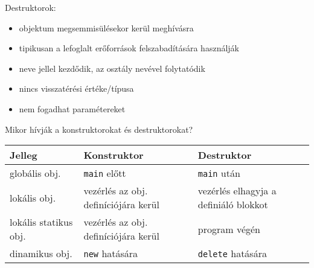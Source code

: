 \documentclass[usenames,dvipsnames,aspectratio=169]{beamer}
\begin{document}
\begin{frame}
    \begin{exampleblock}{}
        
    \end{exampleblock}
\end{frame}

\begin{frame}
    \begin{exampleblock}{}
        
    \end{exampleblock}
\end{frame}

\begin{frame}
    Destruktorok:
    \begin{itemize}
        \item objektum megsemmisülésekor kerül meghívásra
        \item tipikusan a lefoglalt erőforrások felszabadítására használják
        \item neve \kiemel{\textasciitilde} jellel kezdődik, az osztály nevével folytatódik
        \item nincs visszatérési értéke/típusa
        \item nem fogadhat paramétereket
    \end{itemize}
\end{frame}

\begin{frame}
    Mikor hívják a konstruktorokat és destruktorokat?
    \begin{center}
        \begin{tabular}{ p{3cm}|p{4.5cm}|p{4.5cm} } 
        Jelleg & Konstruktor & Destruktor \\
        \hline
        globális obj. & \texttt{main} előtt & \texttt{main} után \\
        lokális obj. & vezérlés az obj. definíciójára kerül & vezérlés elhagyja a definiáló blokkot \\
        lokális statikus obj. & vezérlés az obj. definíciójára kerül & program végén \\
        dinamikus obj. & \texttt{new} hatására & \texttt{delete} hatására
        \end{tabular}
    \end{center}
\end{frame}
\end{document}
